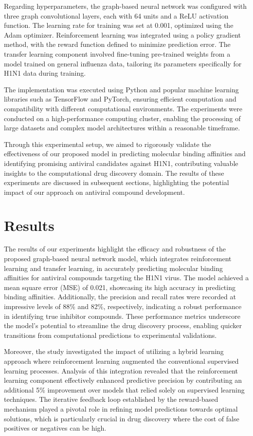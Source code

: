 \documentclass{article}
\begin{document}
Regarding hyperparameters, the graph-based neural network was configured with three graph convolutional layers, each with 64 units and a ReLU activation function. The learning rate for training was set at 0.001, optimized using the Adam optimizer. Reinforcement learning was integrated using a policy gradient method, with the reward function defined to minimize prediction error. The transfer learning component involved fine-tuning pre-trained weights from a model trained on general influenza data, tailoring its parameters specifically for H1N1 data during training.

The implementation was executed using Python and popular machine learning libraries such as TensorFlow and PyTorch, ensuring efficient computation and compatibility with different computational environments. The experiments were conducted on a high-performance computing cluster, enabling the processing of large datasets and complex model architectures within a reasonable timeframe.

Through this experimental setup, we aimed to rigorously validate the effectiveness of our proposed model in predicting molecular binding affinities and identifying promising antiviral candidates against H1N1, contributing valuable insights to the computational drug discovery domain. The results of these experiments are discussed in subsequent sections, highlighting the potential impact of our approach on antiviral compound development.

\section{Results}
The results of our experiments highlight the efficacy and robustness of the proposed graph-based neural network model, which integrates reinforcement learning and transfer learning, in accurately predicting molecular binding affinities for antiviral compounds targeting the H1N1 virus. The model achieved a mean square error (MSE) of 0.021, showcasing its high accuracy in predicting binding affinities. Additionally, the precision and recall rates were recorded at impressive levels of 88\% and 82\%, respectively, indicating a robust performance in identifying true inhibitor compounds. These performance metrics underscore the model's potential to streamline the drug discovery process, enabling quicker transitions from computational predictions to experimental validations.

Moreover, the study investigated the impact of utilizing a hybrid learning approach where reinforcement learning augmented the conventional supervised learning processes. Analysis of this integration revealed that the reinforcement learning component effectively enhanced predictive precision by contributing an additional 5\% improvement over models that relied solely on supervised learning techniques. The iterative feedback loop established by the reward-based mechanism played a pivotal role in refining model predictions towards optimal solutions, which is particularly crucial in drug discovery where the cost of false positives or negatives can be high.
\end{document}
